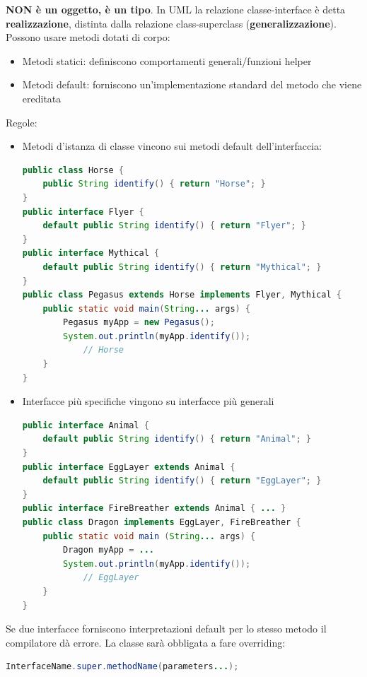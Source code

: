 \documentclass[12pt]{extarticle}
\begin{document}
\noindent\textbf{NON è un oggetto, è un tipo}. In UML la relazione classe-interface è detta \textbf{realizzazione}, distinta dalla relazione class-superclass (\textbf{generalizzazione}).\\

\noindent Possono usare metodi dotati di corpo:
\begin{itemize}
    \item Metodi statici: definiscono comportamenti generali/funzioni helper
    \item Metodi default: forniscono un'implementazione standard del metodo che viene ereditata
\end{itemize}

\noindent Regole:
\begin{itemize}
    \item Metodi d'istanza di classe vincono sui metodi default dell'interfaccia:
\begin{lstlisting}[language=Java]
public class Horse {
    public String identify() { return "Horse"; }
}
public interface Flyer {
    default public String identify() { return "Flyer"; }
}
public interface Mythical {
    default public String identify() { return "Mythical"; }
}
public class Pegasus extends Horse implements Flyer, Mythical {
    public static void main(String... args) {
        Pegasus myApp = new Pegasus();
        System.out.println(myApp.identify());
            // Horse
    }
}
\end{lstlisting}
    \item Interfacce più specifiche vingono su interfacce più generali
\begin{lstlisting}[language=Java]
public interface Animal {
    default public String identify() { return "Animal"; }
}
public interface EggLayer extends Animal {
    default public String identify() { return "EggLayer"; }
}
public interface FireBreather extends Animal { ... }
public class Dragon implements EggLayer, FireBreather {
    public static void main (String... args) {
        Dragon myApp = ...
        System.out.println(myApp.identify());
            // EggLayer
    }
}
\end{lstlisting}
\end{itemize}

\noindent Se due interfacce forniscono interpretazioni default per lo stesso metodo il compilatore dà errore. La classe sarà obbligata a fare overriding:
\begin{lstlisting}[language=Java]
InterfaceName.super.methodName(parameters...);
\end{lstlisting}
\end{document}
